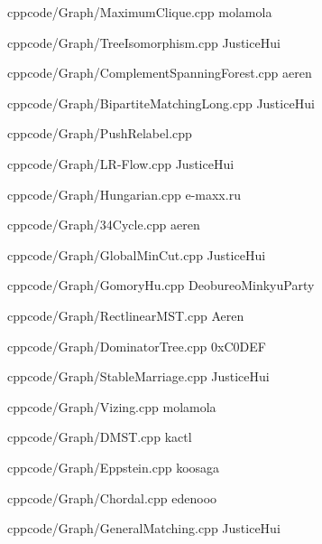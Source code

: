 \documentclass[landscape, 8pt, a4paper, oneside]{extarticle} %
\begin{document}
\begin{multicols*}{3}
{}{}
{cpp}{code/Graph/MaximumClique.cpp}
{molamola}

{}{}
{cpp}{code/Graph/TreeIsomorphism.cpp}
{JusticeHui}

{}{}
{cpp}{code/Graph/ComplementSpanningForest.cpp}
{aeren} %

{}{}
{cpp}{code/Graph/BipartiteMatchingLong.cpp}
{JusticeHui} %



{}{}
{cpp}{code/Graph/PushRelabel.cpp}
{}

{}{}
{cpp}{code/Graph/LR-Flow.cpp}
{JusticeHui}

{}{}
{cpp}{code/Graph/Hungarian.cpp}
{e-maxx.ru}

{}{}
{cpp}{code/Graph/34Cycle.cpp}
{aeren}

{}{}
{cpp}{code/Graph/GlobalMinCut.cpp}
{JusticeHui}

{}{}
{cpp}{code/Graph/GomoryHu.cpp}
{DeobureoMinkyuParty}

{}{}
{cpp}{code/Graph/RectlinearMST.cpp}
{Aeren}

{}{}
{cpp}{code/Graph/DominatorTree.cpp}
{0xC0DEF}

{}{}
{cpp}{code/Graph/StableMarriage.cpp}
{JusticeHui}

{}{}
{cpp}{code/Graph/Vizing.cpp}
{molamola}

{}{}
{cpp}{code/Graph/DMST.cpp}
{kactl}

{}{}
{cpp}{code/Graph/Eppstein.cpp}
{koosaga}

{}{}
{cpp}{code/Graph/Chordal.cpp}
{edenooo}

{}{}
{cpp}{code/Graph/GeneralMatching.cpp}
{JusticeHui}



\end{multicols*}
\end{document}
